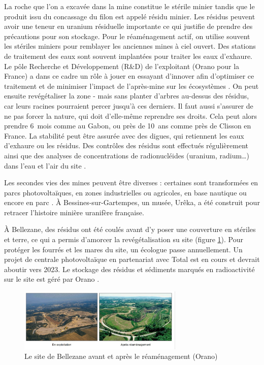 \documentclass{article}
\begin{document}
La roche que l’on a excavée dans la mine constitue le stérile minier tandis que le produit issu du concassage du filon est appelé résidu minier. Les résidus peuvent avoir une teneur en uranium résiduelle importante ce qui justifie de prendre des précautions pour son stockage.
Pour le réaménagement actif, on utilise souvent les stériles miniers pour remblayer les anciennes mines à ciel ouvert.
Des stations de traitement des eaux sont souvent implantées pour traiter les eaux d’exhaure. Le pôle Recherche et Développement (R\&D) de l’exploitant (Orano pour la France) a dans ce cadre un rôle à jouer en essayant d’innover afin d’optimiser ce traitement et de minimiser l’impact de l’après-mine sur les écosystèmes \cite{schick_les_2020}.
On peut ensuite revégétaliser la zone - mais sans planter d’arbres au-dessus des résidus, car leurs racines pourraient percer jusqu’à ces derniers. Il faut aussi s’assurer de ne pas forcer la nature, qui doit d’elle-même reprendre ses droits. Cela peut alors prendre 6~mois comme au Gabon, ou près de 10~ans comme près de Clisson en France. La stabilité peut être assurée avec des digues, qui retiennent les eaux d’exhaure ou les résidus. Des contrôles des résidus sont effectués régulièrement ainsi que des analyses de concentrations de radionucléides (uranium, radium…) dans l’eau et l’air du site \cite{himeur_apres-mine_2020}.

Les secondes vies des mines peuvent être diverses : certaines sont transformées en parcs photovoltaïques, en zones industrielles ou agricoles, en base nautique ou encore en parc \cite{himeur_apres-mine_2020}. À Bessines-sur-Gartempes, un musée, Urêka, a été construit pour retracer l'histoire minière uranifère française.

À Bellezane, des résidus ont été coulés avant d’y poser une couverture en stériles et terre, ce qui a permis d'amorcer la revégétalisation su site (figure \ref{fig:bellezane_avant_apres}). Pour protéger les fourrés et les mares du site, un écologue passe annuellement. Un projet de centrale photovoltaïque en partenariat avec Total est en cours et devrait aboutir vers 2023. Le stockage des résidus et sédiments marqués en radioactivité sur le site est géré par Orano \cite{benesteau_site_2020}.

\begin{figure}[H]
    \centering
    \includegraphics[width=0.7\textwidth]{I_B_2.jpg}
    \caption{Le site de Bellezane avant et après le réaménagement (Orano)}
    \label{fig:bellezane_avant_apres}
\end{figure}
\end{document}
